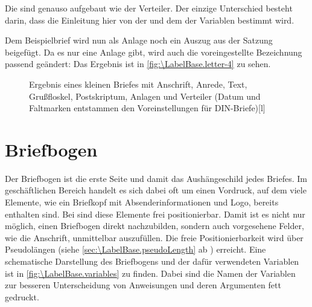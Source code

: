 \begin{Declaration}
\end{Declaration}
Die  sind genauso aufgebaut wie der
Verteiler. Der einzige Unterschied besteht darin, dass die Einleitung
hier von der  und dem  der Variablen
 bestimmt wird.
\begin{Example}
  Dem Beispielbrief wird nun als Anlage noch ein Auszug aus der Satzung
  beigefügt. Da es nur eine Anlage gibt, wird auch die voreingestellte
  Bezeichnung passend geändert:
  Das Ergebnis ist in \autoref{fig:\LabelBase.letter-4} zu sehen.
  \begin{figure}
    \setcapindent{0pt}%
    \begin{captionbeside}{Ergebnis eines kleinen Briefes mit Anschrift, Anrede,
        Text, Grußfloskel, Postskriptum, Anlagen und Verteiler (Datum und
        Faltmarken entstammen den Voreinstellungen für DIN-Briefe)}[l]
    \end{captionbeside}
    \label{fig:\LabelBase.letter-4}
  \end{figure}
\end{Example}
%
\EndIndexGroup
%
\EndIndexGroup



\section{Briefbogen}
\BeginIndexGroup
{}

Der Briefbogen ist die erste Seite und damit das Aushängeschild jedes
Briefes. Im geschäftlichen Bereich handelt es sich dabei oft um einen
Vordruck, auf dem viele Elemente, wie ein Briefkopf mit Absenderinformationen
und Logo, bereits enthalten sind. Bei \KOMAScript{} sind diese Elemente frei
positionierbar. Damit ist es nicht nur möglich, einen Briefbogen direkt
nachzubilden, sondern auch vorgesehene Felder, wie die Anschrift, unmittelbar
auszufüllen. Die freie Positionierbarkeit wird über Pseudolängen (siehe
\autoref{sec:\LabelBase.pseudoLength} ab
) erreicht. Eine schematische
Darstellung des Briefbogens und der dafür verwendeten Variablen ist in
\autoref{fig:\LabelBase.variables} zu finden. Dabei sind die Namen der
Variablen zur besseren Unterscheidung von Anweisungen und deren Argumenten
fett gedruckt.

